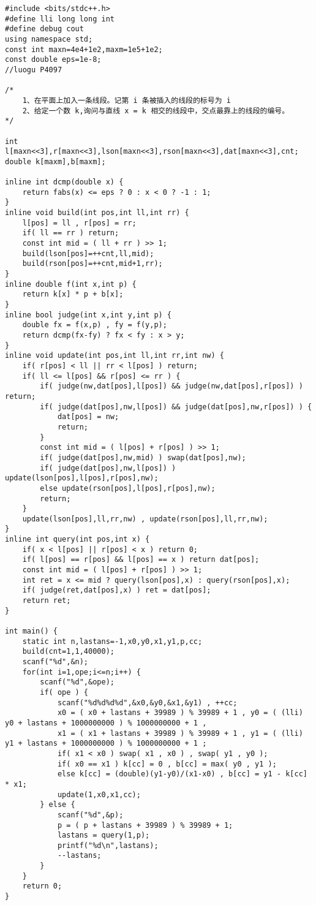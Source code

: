 ﻿\begin{lstlisting}
#include <bits/stdc++.h>
#define lli long long int
#define debug cout
using namespace std;
const int maxn=4e4+1e2,maxm=1e5+1e2;
const double eps=1e-8;
//luogu P4097

/*
	1、在平面上加入一条线段。记第 i 条被插入的线段的标号为 i
	2、给定一个数 k,询问与直线 x = k 相交的线段中，交点最靠上的线段的编号。
*/

int l[maxn<<3],r[maxn<<3],lson[maxn<<3],rson[maxn<<3],dat[maxn<<3],cnt;
double k[maxm],b[maxm];

inline int dcmp(double x) {
    return fabs(x) <= eps ? 0 : x < 0 ? -1 : 1;
}
inline void build(int pos,int ll,int rr) {
    l[pos] = ll , r[pos] = rr;
    if( ll == rr ) return;
    const int mid = ( ll + rr ) >> 1;
    build(lson[pos]=++cnt,ll,mid);
    build(rson[pos]=++cnt,mid+1,rr);
}
inline double f(int x,int p) {
    return k[x] * p + b[x];
}
inline bool judge(int x,int y,int p) {
    double fx = f(x,p) , fy = f(y,p);
    return dcmp(fx-fy) ? fx < fy : x > y;
}
inline void update(int pos,int ll,int rr,int nw) {
    if( r[pos] < ll || rr < l[pos] ) return;
    if( ll <= l[pos] && r[pos] <= rr ) {
        if( judge(nw,dat[pos],l[pos]) && judge(nw,dat[pos],r[pos]) ) return;
        if( judge(dat[pos],nw,l[pos]) && judge(dat[pos],nw,r[pos]) ) {
            dat[pos] = nw;
            return;
        }
        const int mid = ( l[pos] + r[pos] ) >> 1;
        if( judge(dat[pos],nw,mid) ) swap(dat[pos],nw);
        if( judge(dat[pos],nw,l[pos]) ) update(lson[pos],l[pos],r[pos],nw);
        else update(rson[pos],l[pos],r[pos],nw);
        return;
    }
    update(lson[pos],ll,rr,nw) , update(rson[pos],ll,rr,nw);
}
inline int query(int pos,int x) {
    if( x < l[pos] || r[pos] < x ) return 0;
    if( l[pos] == r[pos] && l[pos] == x ) return dat[pos];
    const int mid = ( l[pos] + r[pos] ) >> 1;
    int ret = x <= mid ? query(lson[pos],x) : query(rson[pos],x);
    if( judge(ret,dat[pos],x) ) ret = dat[pos];
    return ret;
}

int main() {
    static int n,lastans=-1,x0,y0,x1,y1,p,cc;
    build(cnt=1,1,40000);
    scanf("%d",&n);
    for(int i=1,ope;i<=n;i++) {
        scanf("%d",&ope);
        if( ope ) {
            scanf("%d%d%d%d",&x0,&y0,&x1,&y1) , ++cc;
            x0 = ( x0 + lastans + 39989 ) % 39989 + 1 , y0 = ( (lli) y0 + lastans + 1000000000 ) % 1000000000 + 1 ,
            x1 = ( x1 + lastans + 39989 ) % 39989 + 1 , y1 = ( (lli) y1 + lastans + 1000000000 ) % 1000000000 + 1 ;
            if( x1 < x0 ) swap( x1 , x0 ) , swap( y1 , y0 );
            if( x0 == x1 ) k[cc] = 0 , b[cc] = max( y0 , y1 );
            else k[cc] = (double)(y1-y0)/(x1-x0) , b[cc] = y1 - k[cc] * x1;
            update(1,x0,x1,cc);
        } else {
            scanf("%d",&p);
            p = ( p + lastans + 39989 ) % 39989 + 1;
            lastans = query(1,p);
            printf("%d\n",lastans);
            --lastans;
        }
    }
    return 0;
}
\end{lstlisting}